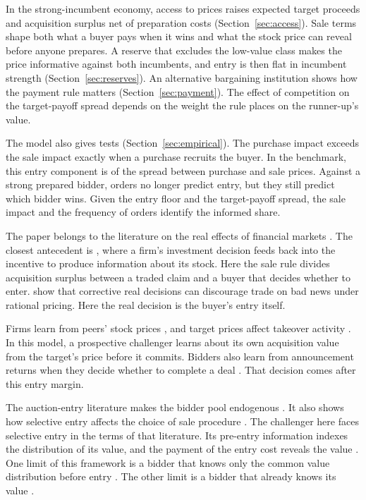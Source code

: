 In the strong-incumbent economy, access to prices raises expected target proceeds and acquisition surplus net
of preparation costs (Section~\ref{sec:access}). Sale terms shape both what a buyer pays when it wins and what the
stock price can reveal before anyone prepares. A reserve that excludes the low-value class makes the price
informative against both incumbents, and entry is then flat in incumbent strength (Section~\ref{sec:reserves}).
An alternative bargaining institution shows how the payment rule matters (Section~\ref{sec:payment}). The effect
of competition on the target-payoff spread depends on the weight the rule places on the runner-up's value.

The model also gives tests (Section~\ref{sec:empirical}). The purchase impact exceeds the sale impact exactly when a
purchase recruits the buyer. In the benchmark, this entry component is  of the spread between
purchase and sale prices. Against a strong prepared bidder, orders no longer predict entry, but they still predict
which bidder wins. Given the entry floor and the target-payoff spread, the sale impact and the frequency of orders
identify the informed share.

The paper belongs to the literature on the real effects of financial markets \citep{BondEdmansGoldstein2012}.
The closest antecedent is \citet{DowGoldsteinGuembel2017}, where a firm's investment decision feeds back into
the incentive to produce information about its stock. Here the sale rule divides acquisition surplus between a
traded claim and a buyer that decides whether to enter. \citet{EdmansGoldsteinJiang2015} show that corrective
real decisions can discourage trade on bad news under rational pricing. Here the real decision is the buyer's
entry itself.

Firms learn from peers' stock prices \citep{FoucaultFresard2014}, and target prices affect takeover activity
\citep{EdmansGoldsteinJiang2012}. In this model, a prospective challenger learns about its own acquisition value
from the target's price before it commits. Bidders also learn from announcement returns when they
decide whether to complete a deal \citep{Luo2005}. That decision comes after this entry margin.

The auction-entry literature makes the bidder pool endogenous
\citep{Samuelson1985,McAfeeMcMillan1987,LevinSmith1994,GentryStroup2019}. It also shows how selective entry
affects the choice of sale procedure \citep{RobertsSweeting2013}. The challenger here faces selective entry in
the terms of that literature. Its pre-entry information indexes the distribution of its value, and the payment
of the entry cost reveals the value \citep{RobertsSweeting2013}. One limit of this framework is a bidder that
knows only the common value distribution before entry \citep{LevinSmith1994}. The other limit is a bidder that
already knows its value \citep{Samuelson1985}.

